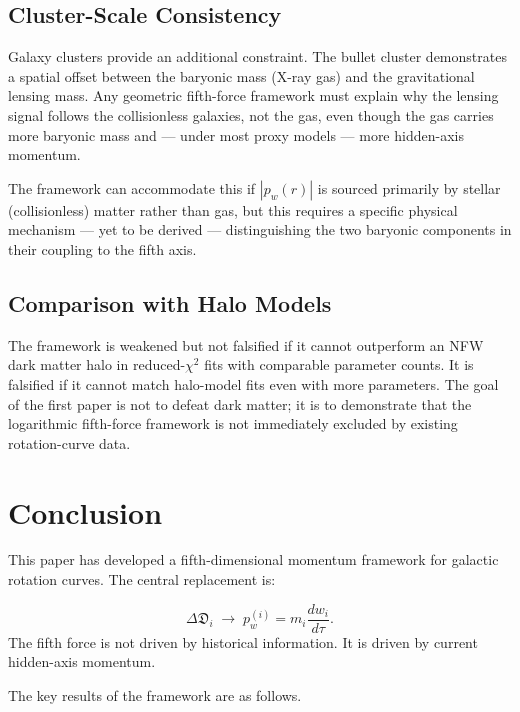 \documentclass[11pt,a4paper]{article}
\newcommand{\pw}{p_w}                        %
\newcommand{\InfoD}{\Delta\mathfrak{D}}      %
\begin{document}
\subsection{Cluster-Scale Consistency}

Galaxy clusters provide an additional constraint.  The bullet cluster
demonstrates a spatial offset between the baryonic mass (X-ray gas) and the
gravitational lensing mass.  Any geometric fifth-force framework must explain
why the lensing signal follows the collisionless galaxies, not the gas, even
though the gas carries more baryonic mass and --- under most proxy models ---
more hidden-axis momentum.

The framework can accommodate this if $|\pw(r)|$ is sourced primarily by
stellar (collisionless) matter rather than gas, but this requires a specific
physical mechanism --- yet to be derived --- distinguishing the two baryonic
components in their coupling to the fifth axis.

\subsection{Comparison with Halo Models}

The framework is weakened but not falsified if it cannot outperform an NFW
dark matter halo in reduced-$\chi^2$ fits with comparable parameter counts.
It is falsified if it cannot match halo-model fits even with more parameters.
The goal of the first paper is not to defeat dark matter; it is to demonstrate
that the logarithmic fifth-force framework is not immediately excluded by
existing rotation-curve data.

\section{Conclusion}\label{sec:conc}

This paper has developed a fifth-dimensional momentum framework for galactic
rotation curves.  The central replacement is:

\begin{keybox}
\[
  \InfoD_i \;\longrightarrow\; \pw^{(i)} = m_i\frac{dw_i}{d\tau} .
\]
The fifth force is not driven by historical information.  It is driven by
current hidden-axis momentum.
\end{keybox}

\noindent
The key results of the framework are as follows.
\end{document}
